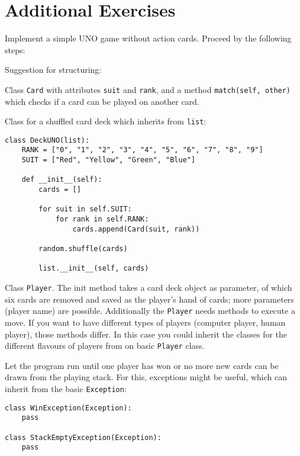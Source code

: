\section*{Additional Exercises}

\begin{aufgabe}[UNO]
Implement a simple UNO game without action cards. Proceed by the following steps:

\begin{teilaufgabe}[Basics]
Suggestion for structuring:
\begin{auflistung}
\item Class \lstinline{Card} with attributes \lstinline{suit} and \lstinline{rank}, and a method \lstinline{match(self, other)} which checks if a card can be played on another card.
\item Class for a shuffled card deck which inherits from \lstinline{list}:
\begin{lstlisting}
class DeckUNO(list):
    RANK = ["0", "1", "2", "3", "4", "5", "6", "7", "8", "9"]
    SUIT = ["Red", "Yellow", "Green", "Blue"]

    def __init__(self):
        cards = []

        for suit in self.SUIT:
            for rank in self.RANK:
                cards.append(Card(suit, rank))

        random.shuffle(cards)

        list.__init__(self, cards)
\end{lstlisting}
\item Class \lstinline{Player}. The init method takes a card deck object as parameter, of which six cards are removed and saved as the player's hand of cards; more parameters (player name) are possible. Additionally the \lstinline{Player} needs methods to execute a move. If you want to have different types of players (computer player, human player), those methods differ. In this case you could inherit the classes for the different flavours of players from on basic \lstinline{Player} class.
\end{auflistung}
Let the program run until one player has won or no more new cards can be drawn from the playing stack. For this, exceptions might be useful, which can inherit from the basic \lstinline{Exception}:
\begin{lstlisting}
class WinException(Exception):
    pass

class StackEmptyException(Exception):
    pass
\end{lstlisting}
\end{teilaufgabe}
\begin{teilaufgabe}


\end{teilaufgabe}
\end{aufgabe}
